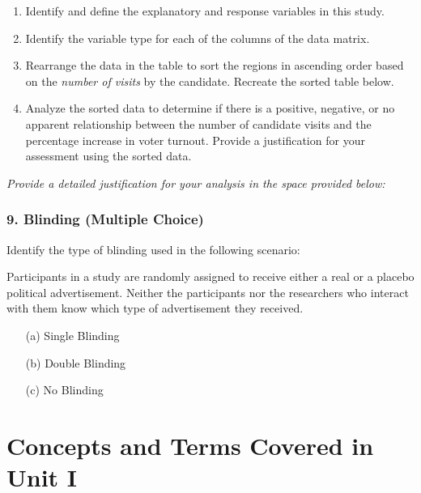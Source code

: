 \documentclass{article}
\begin{document}
\begin{enumerate}
\item Identify and define the explanatory and response variables in this study.
\item Identify the variable type for each of the columns of the data matrix.
\item Rearrange the data in the table to sort the regions in ascending order based on the \emph{number of visits} by the candidate. Recreate the sorted table below.
\item Analyze the sorted data to determine if there is a positive, negative, or no apparent relationship between the number of candidate visits and the percentage increase in voter turnout. Provide a justification for your assessment using the sorted data.
\end{enumerate}

\par \emph{Provide a detailed justification for your analysis in the space provided below:}
\begin{center}
\end{center}

\subsubsection*{9. Blinding (Multiple Choice)}
Identify the type of blinding used in the following scenario:

Participants in a study are randomly assigned to receive either a real or a placebo political advertisement. Neither the participants nor the researchers who interact with them know which type of advertisement they received.

\begin{itemize}
    \item[(a)] Single Blinding
    \item[(b)] Double Blinding
    \item[(c)] No Blinding
\end{itemize}

\section*{Concepts and Terms Covered in Unit I}
\end{document}
